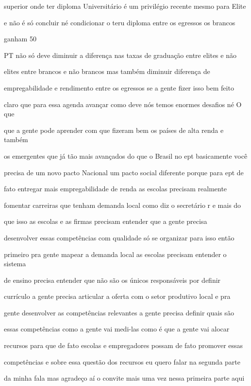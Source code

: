 \documentclass[a4paper,12pt]{article}
\begin{document}
superior onde ter diploma Universitário é um privilégio recente mesmo para Elite

e não é só concluir né condicionar o teru diploma entre os egressos os brancos

ganham 50%

PT não só deve diminuir a diferença nas taxas de graduação entre elites e não

elites entre brancos e não brancos mas também diminuir diferença de

empregabilidade e rendimento entre os egressos se a gente fizer isso bem feito

claro que para essa agenda avançar como deve nós temos enormes desafios né O que

que a gente pode aprender com que fizeram bem os países de alta renda e também

os emergentes que já tão mais avançados do que o Brasil no ept basicamente você

precisa de um novo pacto Nacional um pacto social diferente porque para ept de

fato entregar mais empregabilidade de renda as escolas precisam realmente

fomentar carreiras que tenham demanda local como diz o secretário r e mais do

que isso as escolas e as firmas precisam entender que a gente precisa

desenvolver essas competências com qualidade só se organizar para isso então

primeiro pra gente mapear a demanda local as escolas precisam entender o sistema

de ensino precisa entender que não são os únicos responsáveis por definir

currículo a gente precisa articular a oferta com o setor produtivo local e pra

gente desenvolver as competências relevantes a gente precisa definir quais são

essas competências como a gente vai medi-las como é que a gente vai alocar

recursos para que de fato escolas e empregadores possam de fato promover essas

competências e sobre essa questão dos recursos eu quero falar na segunda parte

da minha fala mas agradeço aí o convite mais uma vez nessa primeira parte aqui
\end{document}
